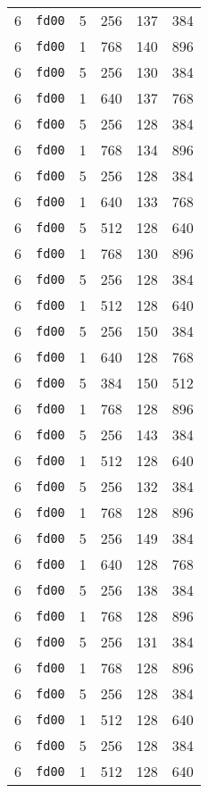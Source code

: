 \documentclass{article}
\begin{document}
\begin{table}[h!]
\begin{tabular}{llrrrl}
    6 & \texttt{fd00} & 5 & 256 & 137 & 384 \\
    6 & \texttt{fd00} & 1 & 768 & 140 & 896 \\
    6 & \texttt{fd00} & 5 & 256 & 130 & 384 \\
    6 & \texttt{fd00} & 1 & 640 & 137 & 768 \\
    6 & \texttt{fd00} & 5 & 256 & 128 & 384 \\
    6 & \texttt{fd00} & 1 & 768 & 134 & 896 \\
    6 & \texttt{fd00} & 5 & 256 & 128 & 384 \\
    6 & \texttt{fd00} & 1 & 640 & 133 & 768 \\
    6 & \texttt{fd00} & 5 & 512 & 128 & 640 \\
    6 & \texttt{fd00} & 1 & 768 & 130 & 896 \\
    6 & \texttt{fd00} & 5 & 256 & 128 & 384 \\
    6 & \texttt{fd00} & 1 & 512 & 128 & 640 \\
    6 & \texttt{fd00} & 5 & 256 & 150 & 384 \\
    6 & \texttt{fd00} & 1 & 640 & 128 & 768 \\
    6 & \texttt{fd00} & 5 & 384 & 150 & 512 \\
    6 & \texttt{fd00} & 1 & 768 & 128 & 896 \\
    6 & \texttt{fd00} & 5 & 256 & 143 & 384 \\
    6 & \texttt{fd00} & 1 & 512 & 128 & 640 \\
    6 & \texttt{fd00} & 5 & 256 & 132 & 384 \\
    6 & \texttt{fd00} & 1 & 768 & 128 & 896 \\
    6 & \texttt{fd00} & 5 & 256 & 149 & 384 \\
    6 & \texttt{fd00} & 1 & 640 & 128 & 768 \\
    6 & \texttt{fd00} & 5 & 256 & 138 & 384 \\
    6 & \texttt{fd00} & 1 & 768 & 128 & 896 \\
    6 & \texttt{fd00} & 5 & 256 & 131 & 384 \\
    6 & \texttt{fd00} & 1 & 768 & 128 & 896 \\
    6 & \texttt{fd00} & 5 & 256 & 128 & 384 \\
    6 & \texttt{fd00} & 1 & 512 & 128 & 640 \\
    6 & \texttt{fd00} & 5 & 256 & 128 & 384 \\
    6 & \texttt{fd00} & 1 & 512 & 128 & 640 \\

\end{tabular}
\end{table}
\end{document}
